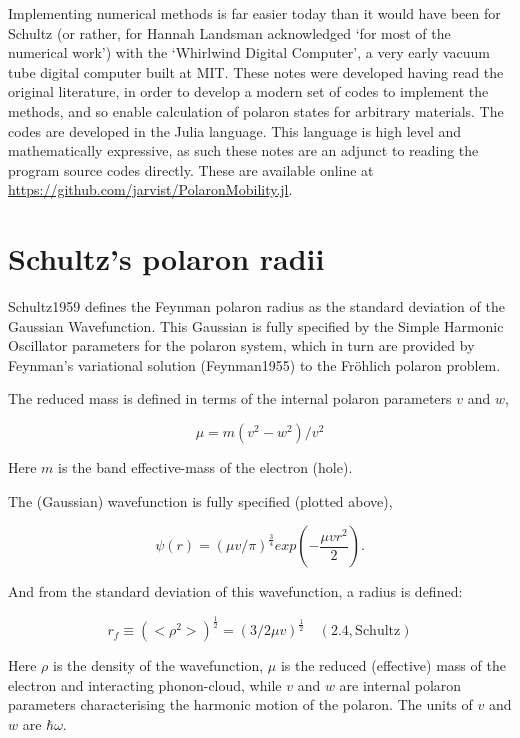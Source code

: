 \documentclass[twocolumn,11pt]{article}
\begin{document}
Implementing numerical methods is far easier today than it would have been for
Schultz (or rather, for Hannah Landsman acknowledged `for most of the numerical
work') with the `Whirlwind Digital Computer'\cite{WhirlwindWikipedia}, a very early
vacuum tube digital computer built at MIT.  
These notes were developed having read the original literature, in order to
develop a modern set of codes to implement the methods, and so enable
calculation of polaron states for arbitrary materials. 
The codes are developed in the Julia language\cite{Julia}. 
This language is high level and mathematically expressive, as such these notes
are an adjunct to reading the program source codes directly.  
These are available online at
\url{https://github.com/jarvist/PolaronMobility.jl}.

\section{Schultz's polaron radii}

Schultz1959\cite{Schultz1959}  defines the
Feynman polaron radius as the standard deviation of the Gaussian Wavefunction. 
This Gaussian is fully specified by the Simple Harmonic Oscillator parameters
for the polaron system, which in turn are provided by Feynman's variational
solution (Feynman1955\cite{Feynman1955}) to the
Fr\"ohlich polaron problem.

The reduced mass is defined in terms of the internal polaron parameters $v$ and
$w$,

\begin{equation}
	\mu=m(v^2-w^2)/v^2
\end{equation}

Here $m$ is the band effective-mass of the electron (hole). 

The (Gaussian) wavefunction is fully specified (plotted above),

\begin{equation}
	\psi(r)=(\mu v/\pi)^{\frac{3}{4}} exp(-\frac{\mu v r^2}{2}).
\end{equation}

And from the standard deviation of this wavefunction, a
radius is defined:

\begin{equation}
    r_f \equiv (<\rho^2>)^{\frac{1}{2}} = (3/2\mu v)^{\frac{1}{2}}
    \quad \mathrm{(2.4, Schultz)}
\end{equation}    

Here $\rho$ is the density of the wavefunction, $\mu$ is the reduced
(effective) mass of the electron and interacting phonon-cloud, while
$v$ and \(w\) are internal polaron parameters characterising the
harmonic motion of the polaron. The units of $v$ and \(w\) are
$\hbar\omega$.
\end{document}

